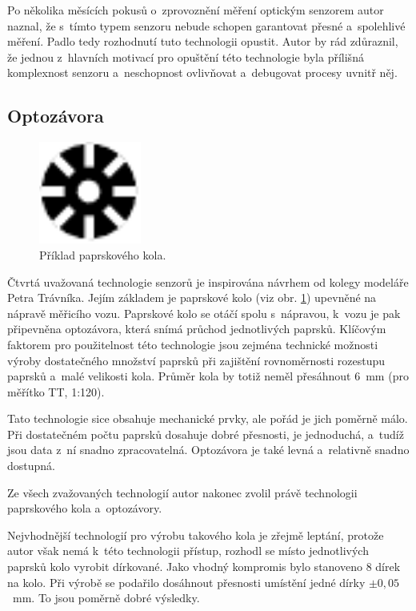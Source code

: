 Po několika měsících pokusů o~zprovoznění měření optickým senzorem autor naznal,
že s~tímto typem senzoru nebude schopen garantovat přesné a~spolehlivé měření.
Padlo tedy rozhodnutí tuto technologii opustit. Autor by rád zdůraznil, že
jednou z~hlavních motivací pro opuštění této technologie byla přílišná
komplexnost senzoru a~neschopnost ovlivňovat a~debugovat procesy uvnitř něj.

\subsection{Optozávora}
\label{subsec:wsm-senzor-optozavora}

\begin{figure}[ht]
\includegraphics[width=0.3\textwidth]{data/clonka.pdf}
\caption{Příklad paprskového kola.}
\label{fig:wheel}
\end{figure}

Čtvrtá uvažovaná technologie senzorů je inspirována návrhem od kolegy modeláře
Petra Trávníka. Jejím základem je paprskové kolo (viz obr. \ref{fig:wheel})
upevněné na nápravě měřicího vozu. Paprskové kolo se otáčí spolu s~nápravou,
k~vozu je pak připevněna optozávora, která snímá průchod jednotlivých paprsků.
Klíčovým faktorem pro použitelnost této technologie jsou zejména technické
možnosti výroby dostatečného množství paprsků při zajištění rovnoměrnosti
rozestupu paprsků a~malé velikosti kola. Průměr kola by totiž neměl přesáhnout
$6$~mm (pro měřítko TT, 1:120).

Tato technologie sice obsahuje mechanické prvky, ale pořád je jich poměrně
málo. Při dostatečném počtu paprsků dosahuje dobré přesnosti, je jednoduchá,
a~tudíž jsou data z~ní snadno zpracovatelná. Optozávora je také levná a~relativně
snadno dostupná.

Ze všech zvažovaných technologií autor nakonec zvolil právě technologii
paprskového kola a~optozávory.

Nejvhodnější technologií pro výrobu takového kola je zřejmě leptání, protože
autor však nemá k~této technologii přístup, rozhodl se místo jednotlivých
paprsků kolo vyrobit dírkované. Jako vhodný kompromis bylo stanoveno
8 dírek na kolo. Při výrobě se podařilo dosáhnout přesnosti umístění jedné
dírky $\pm 0,05$~mm. To jsou poměrně dobré výsledky.

